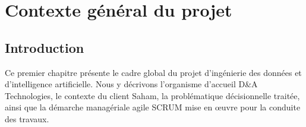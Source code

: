 \documentclass[a4paper,12pt]{report}
\begin{document}
\newpage
\chapter{Contexte général du projet}

\section*{Introduction}
\begin{doublespace}
Ce premier chapitre présente le cadre global du projet d'ingénierie des données et d'intelligence artificielle. Nous y décrivons l'organisme d'accueil D\&A Technologies, le contexte du client Saham, la problématique décisionnelle traitée, ainsi que la démarche managériale agile SCRUM mise en œuvre pour la conduite des travaux.
\end{doublespace}
\end{document}
